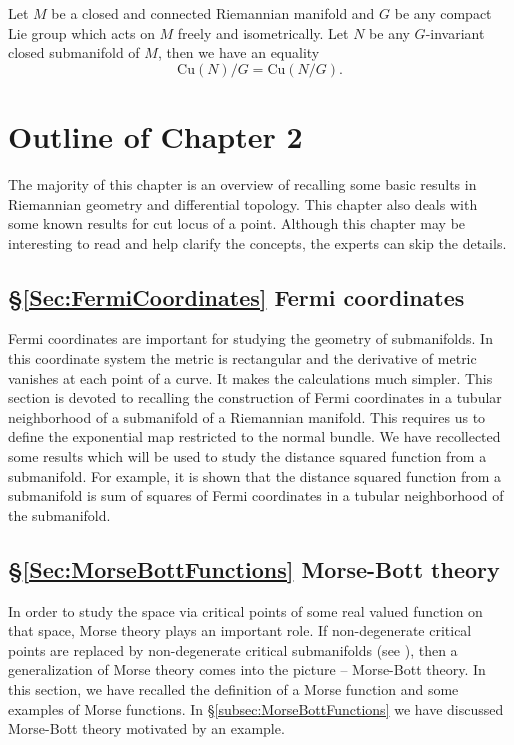 \begin{mainthm}\label{thm:ThmE}
    Let $M$ be a closed and connected Riemannian manifold  and $G$ be any compact Lie group which acts on $M$ freely and isometrically. Let $N$ be any $G$-invariant closed submanifold of $M$, then we have an equality
    \begin{displaymath}
        \mathrm{Cu}(N)/G  = \mathrm{Cu}(N/G).
    \end{displaymath}
\end{mainthm}

\section{Outline of Chapter 2}
\hfb The majority of this chapter is an overview of recalling some basic results in Riemannian geometry and differential topology. This chapter also deals with some known results for cut locus of a point. Although this chapter may be interesting to read and help clarify the concepts, the experts can skip the details.

\subsection*{\S \ref{Sec:FermiCoordinates} Fermi coordinates}
\hfb Fermi coordinates  are important for studying the geometry of submanifolds. In this coordinate system the metric is rectangular and the derivative of metric vanishes at each point of a curve. It makes the calculations much simpler. This section is devoted to recalling the construction of Fermi coordinates in a tubular neighborhood of a submanifold of a Riemannian manifold. This requires us to define the exponential map restricted to the normal bundle. We have recollected some results which will be used to study the distance squared function from a submanifold. For example, it is shown that the distance squared function from a submanifold is sum of squares of Fermi coordinates in a tubular neighborhood of the submanifold.

\subsection*{\S \ref{Sec:MorseBottFunctions} Morse-Bott theory}
\hfb In order to study the space via critical points of some real valued function on that space, Morse theory plays an important role. If non-degenerate critical points are replaced by non-degenerate critical submanifolds (see ), then a generalization of Morse theory comes into the picture -- Morse-Bott theory. In this section, we have recalled the definition of a Morse function and some examples of Morse functions. In \S\ref{subsec:MorseBottFunctions} we have discussed Morse-Bott theory motivated by an example.

